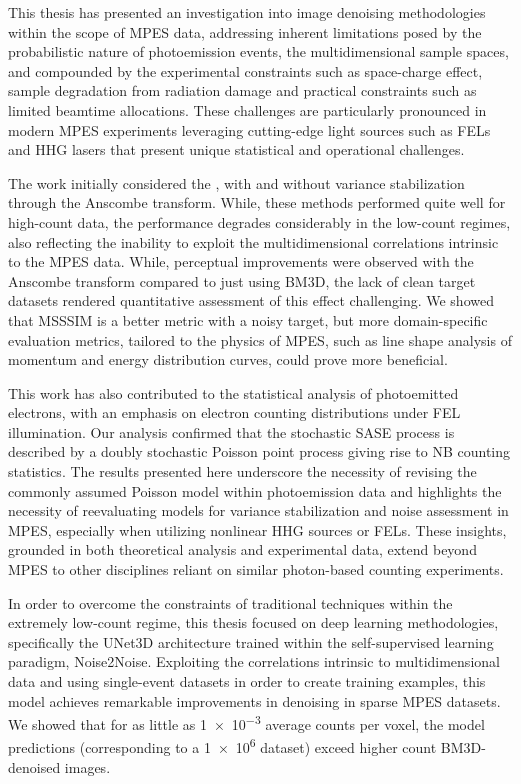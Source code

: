 This thesis has presented an investigation into image denoising methodologies within the scope of \gls{MPES} data, addressing inherent limitations posed by the probabilistic nature of photoemission events, the multidimensional sample spaces, and compounded by the experimental constraints such as space-charge effect, sample degradation from radiation damage and practical constraints such as limited  beamtime allocations. These challenges are particularly pronounced in modern \gls{MPES} experiments leveraging cutting-edge light sources such as \glspl{FEL} and \gls{HHG} lasers that present unique statistical and operational challenges.

The work initially considered the , with and without variance stabilization through the Anscombe transform. While, these methods performed quite well for high-count data, the performance degrades considerably in the low-count regimes, also reflecting the inability to exploit the multidimensional correlations intrinsic to the MPES data. While, perceptual improvements were observed with the Anscombe transform compared to just using \gls{BM3D}, the lack of clean target datasets rendered quantitative assessment of this effect challenging. We showed that \gls{MSSSIM} is a better metric with a noisy target, but more domain-specific evaluation metrics, tailored to the physics of \gls{MPES}, such as line shape analysis of momentum and energy distribution curves, could prove more beneficial.

This work has also contributed to the statistical analysis of photoemitted electrons, with an emphasis on electron counting distributions under FEL illumination. Our analysis confirmed that the stochastic SASE process is described by a doubly stochastic Poisson point process giving rise to NB counting statistics. The results presented here underscore the necessity of revising the commonly assumed Poisson model  within photoemission data and highlights the necessity of reevaluating models for variance stabilization and noise assessment in \gls{MPES}, especially when utilizing nonlinear \gls{HHG} sources or \glspl{FEL}. These insights, grounded in both theoretical analysis and experimental data, extend beyond \gls{MPES} to other disciplines reliant on similar photon-based counting experiments. 

In order to overcome the constraints of traditional techniques within the extremely low-count regime, this thesis focused on deep learning methodologies, specifically the UNet3D architecture trained within the self-supervised learning paradigm, Noise2Noise. Exploiting the  correlations intrinsic to multidimensional data and using single-event datasets in order to create training examples, this model achieves  remarkable improvements in denoising in sparse \gls{MPES} datasets. We showed that for as little as \num{1e-3} average counts per voxel, the model predictions (corresponding to a \num{1e6} dataset) exceed higher count \gls{BM3D}-denoised images.

